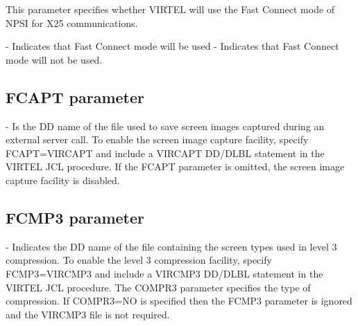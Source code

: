 \documentclass[letterpaper,10pt,english]{sphinxmanual}
\begin{document}
This parameter specifies whether VIRTEL will use the Fast Connect mode of NPSI for X25 communications.

 - Indicates that Fast Connect mode will be used
 - Indicates that Fast Connect mode will not be used.


\subsection{FCAPT parameter}
\label{\detokenize{Installation_Guide:index-64}}\label{\detokenize{Installation_Guide:fcapt-parameter}}
\begin{sphinxVerbatim}[commandchars=\\\{\}]
  
\end{sphinxVerbatim}

 - Is the DD name of the file used to save screen images captured during an external server call. To enable the screen image capture facility, specify FCAPT=VIRCAPT and include a VIRCAPT DD/DLBL statement in the VIRTEL JCL procedure. If the FCAPT parameter is omitted, the screen image capture facility is disabled.


\subsection{FCMP3 parameter}
\label{\detokenize{Installation_Guide:index-65}}\label{\detokenize{Installation_Guide:fcmp3-parameter}}
\begin{sphinxVerbatim}[commandchars=\\\{\}]
 
\end{sphinxVerbatim}

 - Indicates the DD name of the file containing the screen types used in level 3 compression. To enable the level 3 compression facility, specify FCMP3=VIRCMP3 and include a VIRCMP3 DD/DLBL statement in the VIRTEL JCL procedure. The COMPR3 parameter specifies the type of compression. If COMPR3=NO is specified then the FCMP3 parameter is ignored and the VIRCMP3 file is not required.
\end{document}

